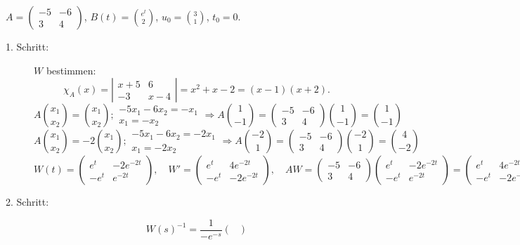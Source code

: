 \begin{beispiel*}
	$ A=\begin{pmatrix}
	-5&-6\\3&4
	\end{pmatrix} $, $ B(t)=\binom{e^t}{2} $, $ u_0=\binom{3}{1} $, $ t_0=0 $.
	\begin{description}
		\item[1. Schritt:] $ W $ bestimmen: \[ \chi_A(x)=\left|\begin{smallmatrix}x+5&6\\-3&x-4\end{smallmatrix}\right|=x^2+x-2=(x-1)(x+2). \]
		\[ A\binom{x_1}{x_2}=\binom{x_1}{x_2};\begin{smallmatrix}
		-5x_1-6x_2=-x_1\\x_1=-x_2
		\end{smallmatrix}\Rightarrow A\binom{1}{-1}=\begin{pmatrix}
		-5&-6\\3&4
		\end{pmatrix}\binom{1}{-1}=\binom{1}{-1} \]
		\[ A\binom{x_1}{x_2}=-2\binom{x_1}{x_2};\begin{smallmatrix}
		-5x_1-6x_2=-2x_1\\x_1=-2x_2
		\end{smallmatrix}\Rightarrow A\binom{-2}{1}=\begin{pmatrix}
		-5&-6\\3&4
		\end{pmatrix}\binom{-2}{1}=\binom{4}{-2} \]
		\[ W(t)=\begin{pmatrix}
		e^t&-2e^{-2t}\\
		-e^t&e^{-2t}
		\end{pmatrix},\quad W'= \begin{pmatrix}
		e^t&4e^{-2t}\\-e^t&-2e^{-2t}
		\end{pmatrix},\quad AW=\begin{pmatrix}
		-5&-6\\3&4
		\end{pmatrix}\begin{pmatrix}
		e^t&-2e^{-2t}\\-e^t&e^{-2t}
		\end{pmatrix}=\begin{pmatrix}
		e^t&4e^{-2t}\\-e^t&-2e^{-2t}
		\end{pmatrix}=W' \]
		\item[2. Schritt:] \[ W(s)^{-1}=\frac{1}{-e^{-s}}\begin{pmatrix}

\end{pmatrix}\]
\end{description}
\end{beispiel*}
